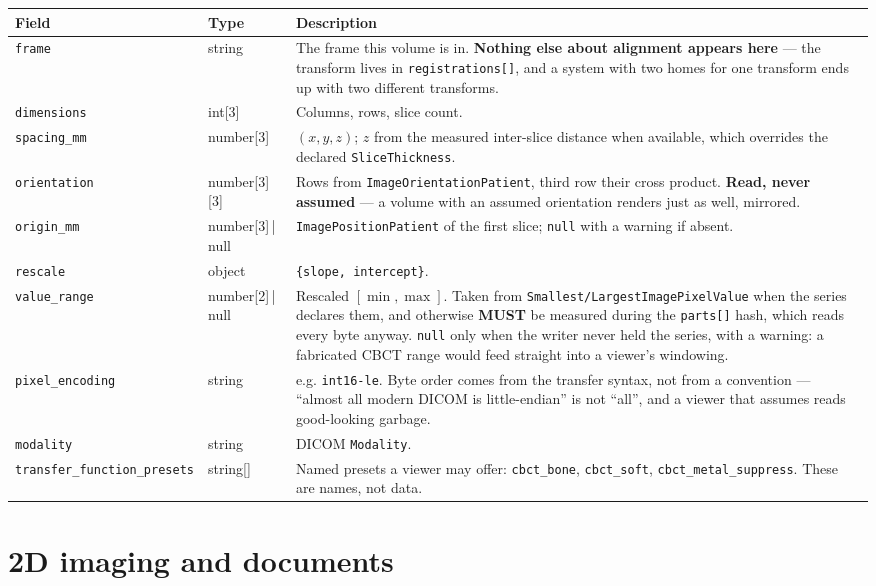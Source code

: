 \documentclass[11pt,a4paper]{article}
\newcommand{\MUST}{\textcolor{uosred}{\textbf{MUST}}}
\newcommand{\code}[1]{\texttt{\small #1}}
\begin{document}
\begin{longtable}{L{4.6cm} L{2.6cm} L{7.8cm}}
\toprule
\textbf{Field} & \textbf{Type} & \textbf{Description}\\
\midrule
\endhead
\code{frame} & string & The frame this volume is in. \textbf{Nothing else about alignment
appears here} --- the transform lives in \code{registrations[]}, and a system with two
homes for one transform ends up with two different transforms.\\
\code{dimensions} & int[3] & Columns, rows, slice count.\\
\code{spacing\_mm} & number[3] & $(x, y, z)$; $z$ from the measured inter-slice distance
when available, which overrides the declared \code{SliceThickness}.\\
\code{orientation} & number[3][3] & Rows from \code{ImageOrientationPatient}, third row
their cross product. \textbf{Read, never assumed} --- a volume with an assumed orientation
renders just as well, mirrored.\\
\code{origin\_mm} & number[3]\,|\,null & \code{ImagePositionPatient} of the first slice;
\code{null} with a warning if absent.\\
\code{rescale} & object & \code{\{slope, intercept\}}.\\
\code{value\_range} & number[2]\,|\,null & Rescaled $[\min,\max]$. Taken from
\code{Smallest/LargestImagePixelValue} when the series declares them, and otherwise
\MUST{} be measured during the \code{parts[]} hash, which reads every byte anyway.
\code{null} only when the writer never held the series, with a warning: a fabricated
CBCT range would feed straight into a viewer's windowing.\\
\code{pixel\_encoding} & string & e.g. \code{int16-le}. Byte order comes from the transfer
syntax, not from a convention --- ``almost all modern DICOM is little-endian'' is not
``all'', and a viewer that assumes reads good-looking garbage.\\
\code{modality} & string & DICOM \code{Modality}.\\
\code{transfer\_function\_presets} & string[] & Named presets a viewer may offer:
\code{cbct\_bone}, \code{cbct\_soft}, \code{cbct\_metal\_suppress}. These are names, not
data.\\
\bottomrule
\end{longtable}

\section{2D imaging and documents}\label{sec:image2d}
\end{document}
